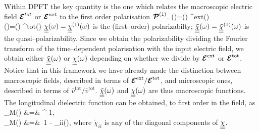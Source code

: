        Within DPFT the key quantity is the one which relates the macroscopic electric
       field $\boldsymbol{\cal E}^{tot}$ or $\boldsymbol{\cal E}^{ext}$ to the first order polarisation ${\boldsymbol {\cal P}}^{(1)}$.
       \bea
       (\w)=\newtensor{\tilde{\chi}}(\w) \Efield^{ext}(\w) \label{eq:tsusc1} \\
       (\w)=\newtensor{       \chi }(\w) \Efield^{tot}(\w)  \label{eq:susc1}     
       \eea
       $\underline{\underline{\chi}}(\omega)=\underline{\underline{\chi}}^{(1)}(\omega)$ is the (first--order) polarizabilty;
       $\underline{\underline{\tilde{\chi}}}(\omega)=\underline{\underline{\tilde{\chi}}}^{(1)}(\omega)$ is the quasi--polarizability.
       Since we obtain the polarizability dividing the Fourier transform of the time--dependent
       polarisation with the input electric field, we obtain either
       $\underline{\underline{\tilde{\chi}}}(\omega)$ or $\underline{\underline{\chi}}(\omega)$
       depending on whether we divide by $\boldsymbol{\cal E}^{\text{ext}}$ or $\boldsymbol{\cal E}^{\text{tot}}$.
       Notice that in this framework we have already made the distinction between macroscopic fields,
       described in terms of $\boldsymbol{\cal E}^{\text{ext}}/\boldsymbol{\cal E}^{\text{tot}}$, and microscopic ones,
       described in terms of $\bar v^{\text{tot}}/\bar v^{\text{tot}}$.
       $\underline{\underline{\tilde{\chi}}}(\omega)$ and $\underline{\underline{\chi}}(\omega)$
       are thus macroscopic functions.
       The longitudinal dielectric function can be obtained, to first order in the field, as
       \bea
       \epsilon_M(\w) &=& ^{-1}, \\
       \epsilon_M(\w) &=&\       1 -        \chi_{ii}(\w),
       \eea
       where $\tilde{\chi}_{ii}$ is any of the diagonal components of $\underline{\underline{\chi}}$.

